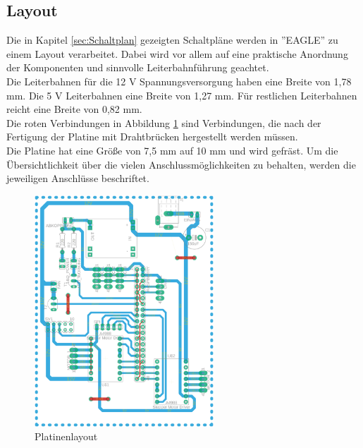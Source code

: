 \subsection{Layout}

Die in Kapitel \ref{sec:Schaltplan} gezeigten Schaltpläne werden in ''EAGLE'' zu einem Layout verarbeitet. Dabei wird vor allem auf eine praktische Anordnung der Komponenten und sinnvolle Leiterbahnführung geachtet.\\
Die Leiterbahnen für die 12 V Spannungsversorgung haben eine Breite von 1,78 mm. Die 5 V Leiterbahnen eine Breite von 1,27 mm. Für restlichen Leiterbahnen reicht eine Breite von 0,82 mm. \\
Die roten Verbindungen in Abbildung \ref{layout} sind Verbindungen, die nach der Fertigung der Platine mit Drahtbrücken hergestellt werden müssen. \\
Die Platine hat eine Größe von 7,5 mm auf 10 mm und wird gefräst. Um die Übersichtlichkeit über die vielen Anschlussmöglichkeiten zu behalten, werden die jeweiligen Anschlüsse beschriftet. 


\begin{figure}[H]
	\centering
	\includegraphics[width=0.6\textwidth]{images/Hardware/Layout}
	\caption{Platinenlayout}
	\label{layout}
\end{figure}





